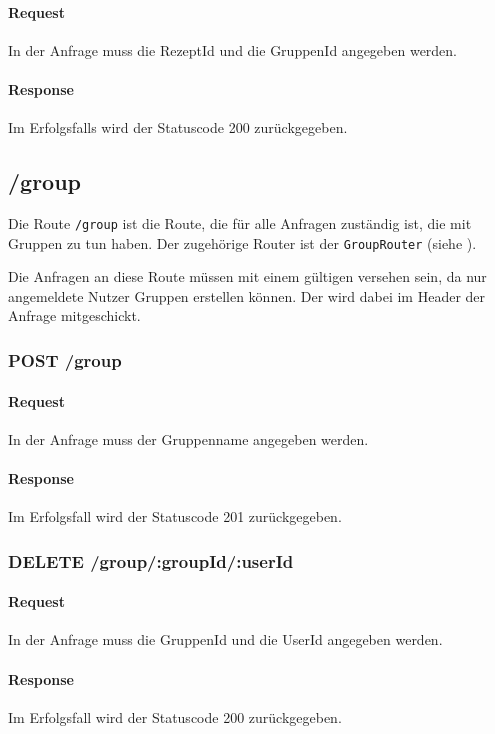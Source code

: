 \documentclass{entwurfsheft}
\begin{document}
    \paragraph{Request}
        In der Anfrage muss die RezeptId und die GruppenId angegeben werden.
    \paragraph{Response}
        Im Erfolgsfalls wird der Statuscode 200 zurückgegeben.

\subsection{/group}
Die Route \texttt{/group} ist die Route, die für alle Anfragen zuständig ist, die mit Gruppen zu tun haben.
Der zugehörige Router ist der \texttt{GroupRouter} (siehe ).

Die Anfragen an diese Route müssen mit einem gültigen  versehen sein, da nur angemeldete Nutzer Gruppen erstellen können.
Der  wird dabei im Header der Anfrage mitgeschickt.

\subsubsection*{POST /group}
    \paragraph{Request}
        In der Anfrage muss der Gruppenname angegeben werden.
    \paragraph{Response}
        Im Erfolgsfall wird der Statuscode 201 zurückgegeben.
    
\subsubsection*{DELETE /group/:groupId/:userId}
    \paragraph{Request}
        In der Anfrage muss die GruppenId und die UserId angegeben werden.
    \paragraph{Response}
        Im Erfolgsfall wird der Statuscode 200 zurückgegeben.
        
\end{document}
